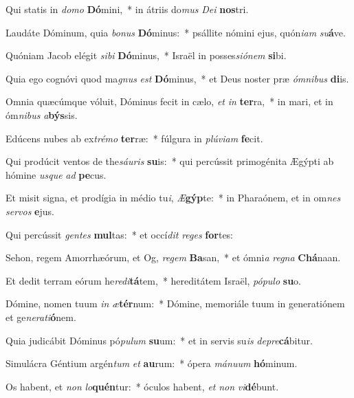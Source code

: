 \item Qui statis in \textit{do}\textit{mo} \textbf{Dó}mini,~* in átriis do\textit{mus} \textit{De}\textit{i} \textbf{nos}tri.
\item Laudáte Dóminum, quia \textit{bo}\textit{nus} \textbf{Dó}minus:~* psállite nómini ejus, quón\textit{i}\textit{am} \textit{su}\textbf{á}ve.
\item Quóniam Jacob elégit \textit{si}\textit{bi} \textbf{Dó}minus,~* Israël in posses\textit{si}\textit{ó}\textit{nem} \textbf{si}bi.
\item Quia ego cognóvi quod ma\textit{gnus} \textit{est} \textbf{Dó}minus,~* et Deus noster præ \textit{óm}\textit{ni}\textit{bus} \textbf{di}is.
\item Omnia quæcúmque vóluit, Dóminus fecit in cælo, \textit{et} \textit{in} \textbf{ter}ra,~* in mari, et in óm\textit{ni}\textit{bus} \textit{a}\textbf{býs}sis.
\item Edúcens nubes ab ex\textit{tré}\textit{mo} \textbf{ter}ræ:~* fúlgura in \textit{plú}\textit{vi}\textit{am} \textbf{fe}cit.
\item Qui prodúcit ventos de the\textit{sáu}\textit{ris} \textbf{su}is:~* qui percússit primogénita Ægýpti ab hómine \textit{us}\textit{que} \textit{ad} \textbf{pe}cus.
\item Et misit signa, et prodígia in médio tu\textit{i}, \textit{Æ}\textbf{gýp}te:~* in Pharaónem, et in om\textit{nes} \textit{ser}\textit{vos} \textbf{e}jus.
\item Qui percússit \textit{gen}\textit{tes} \textbf{mul}tas:~* et occí\textit{dit} \textit{re}\textit{ges} \textbf{for}tes:
\item Sehon, regem Amorrhæórum, et Og, \textit{re}\textit{gem} \textbf{Ba}san,~* et ómni\textit{a} \textit{re}\textit{gna} \textbf{Chá}naan.
\item Et dedit terram eórum he\textit{re}\textit{di}\textbf{tá}tem,~* hereditátem Israël, \textit{pó}\textit{pu}\textit{lo} \textbf{su}o.
\item Dómine, nomen tuum \textit{in} \textit{æ}\textbf{tér}num:~* Dómine, memoriále tuum in generatiónem et ge\textit{ne}\textit{ra}\textit{ti}\textbf{ó}nem.
\item Quia judicábit Dóminus pó\textit{pu}\textit{lum} \textbf{su}um:~* et in servis su\textit{is} \textit{de}\textit{pre}\textbf{cá}bitur.
\item Simulácra Géntium argén\textit{tum} \textit{et} \textbf{au}rum:~* ópera \textit{má}\textit{nu}\textit{um} \textbf{hó}minum.
\item Os habent, et \textit{non} \textit{lo}\textbf{quén}tur:~* óculos habent, \textit{et} \textit{non} \textit{vi}\textbf{dé}bunt.
